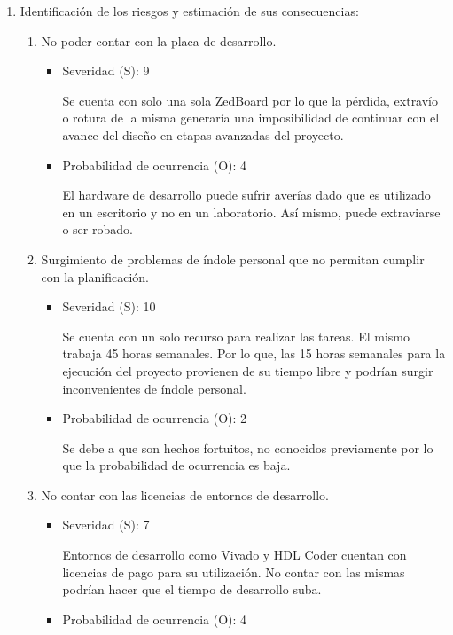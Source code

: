 \documentclass[
11pt, %
]{charter}
\begin{document}
\begin{enumerate}[]
	\item Identificación de los riesgos y estimación de sus consecuencias:
	\begin{enumerate}[$\text{Riesgo}$ 1:, leftmargin=*,align=left] 
		
		\item No poder contar con la placa de desarrollo.
		\begin{itemize}
			\item Severidad (S): 9
			
			Se cuenta con solo una sola ZedBoard por lo que la pérdida, extravío o rotura de la misma generaría una imposibilidad de continuar con el avance del diseño en etapas avanzadas del proyecto.
			\item Probabilidad de ocurrencia (O): 4
			
			El hardware de desarrollo puede sufrir averías dado que es utilizado en un escritorio y no en un laboratorio. Así mismo, puede extraviarse o ser robado.
		\end{itemize}

		\item Surgimiento de problemas de índole personal que no permitan cumplir con la planificación.
		\begin{itemize}
			\item Severidad (S): 10
			
			Se cuenta con un solo recurso para realizar las tareas. El mismo trabaja 45 horas semanales. Por lo que, las 15 horas semanales para la ejecución del proyecto provienen de su tiempo libre y podrían surgir inconvenientes de índole personal.
			\item Probabilidad de ocurrencia (O): 2
			
			Se debe a que son hechos fortuitos, no conocidos previamente por lo que la probabilidad de ocurrencia es baja.
		\end{itemize}

		\item No contar con las licencias de entornos de desarrollo.
		\begin{itemize}
			\item Severidad (S): 7
			
			Entornos de desarrollo como Vivado y HDL Coder cuentan con licencias de pago para su utilización. No contar con las mismas podrían hacer que el tiempo de desarrollo suba.
			\item Probabilidad de ocurrencia (O): 4
			

\end{itemize}
\end{enumerate}
\end{enumerate}
\end{document}
